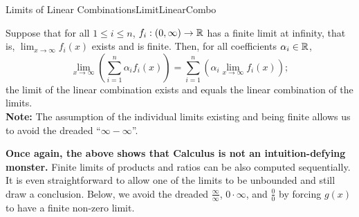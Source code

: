 \begin{propColor}{Limits of Linear Combinations}{LimitLinearCombo}

Suppose that for all $1 \le i \le n$, $f_i:(0, \infty) \to \mathbb R$ has a finite limit at infinity, that is, $\displaystyle \lim_{x \to \infty} f_i(x)$ exists and is finite. Then, for all coefficients $\alpha_i \in \mathbb R$,
\begin{equation}
\label{eq:LimitLinearCombo}
        \lim_{x \to \infty}\left(\sum_{i=1}^{n} \alpha_i f_i(x) \right)= \sum_{i=1}^{n}   \left( \alpha_i \lim_{x \to \infty}  f_i(x) \right);
\end{equation}
the limit of the linear combination exists and equals the linear combination of the limits. \\


\textbf{Note:} The assumption of the individual limits existing and being finite allows us to avoid the dreaded ``$\infty - \infty$''. 
\end{propColor}

\bigskip
\textbf{Once again, the above shows that Calculus is not an intuition-defying monster.} Finite limits of products and ratios can be also computed sequentially. It is even straightforward to allow one of the limits to be unbounded and still draw a conclusion. Below, we avoid the dreaded $\frac{\infty}{\infty}$, $0 \cdot \infty$, and $\frac{0}{0}$ by forcing $g(x)$ to have a finite non-zero limit.

\bigskip

